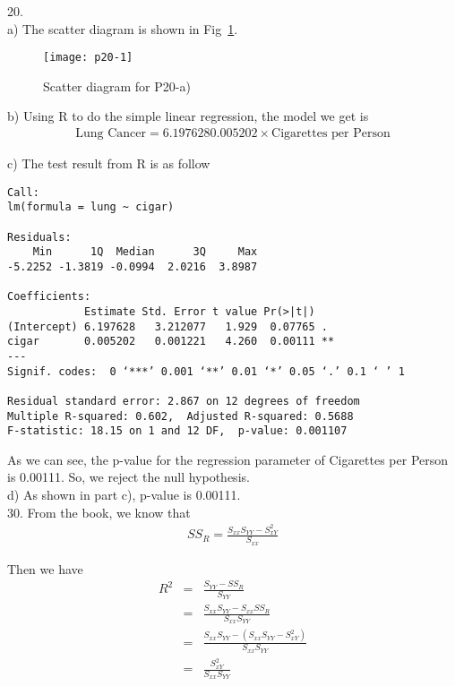 \documentclass[12pt]{article}
\begin{document}
20. \\
a) The scatter diagram is shown in Fig~\ref{fig:p20-1}. \\
\begin{figure}[ht!]
  \centering
  \texttt{[image: p20-1]}
  \caption{Scatter diagram for P20-a) \label{fig:p20-1}}
\end{figure}

b) Using R to do the simple linear regression, the model we get is
\begin{eqnarray*}
  \text{Lung Cancer} = 6.197628     0.005202 \times \text{Cigarettes per Person}
\end{eqnarray*}

c) The test result from R is as follow
\begin{verbatim}
Call:
lm(formula = lung ~ cigar)

Residuals:
    Min      1Q  Median      3Q     Max 
-5.2252 -1.3819 -0.0994  2.0216  3.8987 

Coefficients:
            Estimate Std. Error t value Pr(>|t|)   
(Intercept) 6.197628   3.212077   1.929  0.07765 . 
cigar       0.005202   0.001221   4.260  0.00111 **
---
Signif. codes:  0 ‘***’ 0.001 ‘**’ 0.01 ‘*’ 0.05 ‘.’ 0.1 ‘ ’ 1 

Residual standard error: 2.867 on 12 degrees of freedom
Multiple R-squared: 0.602,	Adjusted R-squared: 0.5688 
F-statistic: 18.15 on 1 and 12 DF,  p-value: 0.001107
\end{verbatim}

As we can see, the p-value for the regression parameter of Cigarettes per Person is 0.00111. So, we reject the null hypothesis. \\

d) As shown in part c), p-value is 0.00111. \\

30. From the book, we know that
\begin{eqnarray*}
  SS_R = \frac {S_{xx}S_{YY} - S_{xY}^2}{S_{xx}}
\end{eqnarray*}

Then we have
\begin{eqnarray*}
  R^2 &=& \frac {S_{YY} - SS_{R}}{S_{YY}} \\
  &=& \frac {S_{xx}S_{YY} - S_{xx}SS_R}{S_{xx}S_{YY}} \\
  &=& \frac {S_{xx}S_{YY} - (S_{xx}S_{YY} - S_{xY}^2)}{S_{xx}S_{YY}} \\
  &=& \frac {S_{xY}^2}{S_{xx}S_{YY}}
\end{eqnarray*}
\end{document}
